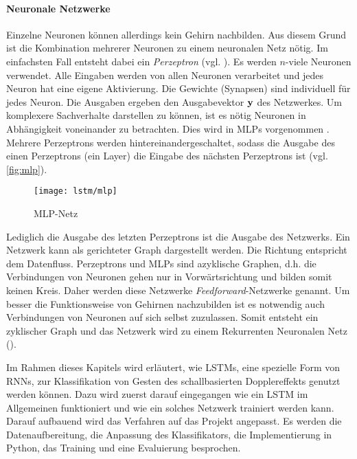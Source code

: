 \paragraph{Neuronale Netzwerke}
Einzelne Neuronen können allerdings kein Gehirn nachbilden. Aus diesem Grund ist
die Kombination mehrerer Neuronen zu einem neuronalen Netz nötig. Im einfachsten
Fall entsteht dabei ein \textit{Perzeptron} (vgl.
\cite{rosenblatt58a,1165576}). Es werden $n$-viele Neuronen verwendet. Alle
Eingaben werden von allen Neuronen verarbeitet und jedes Neuron hat eine eigene
Aktivierung. Die Gewichte (Synapsen) sind individuell für jedes Neuron. Die
Ausgaben ergeben den Ausgabevektor $\bf{y}$ des Netzwerkes. Um komplexere
Sachverhalte darstellen zu können, ist es nötig Neuronen in Abhängigkeit
voneinander zu betrachten. Dies wird in \acp{MLP} vorgenommen \cite{1165576}.
Mehrere Perzeptrons werden hintereinandergeschaltet, sodass die Ausgabe des
einen Perzeptrons (ein Layer) die Eingabe des nächsten Perzeptrons ist (vgl.
\autoref{fig:mlp}).
\begin{figure}[htbp]
    \centering
   \texttt{[image: lstm/mlp]}
\caption{MLP-Netz}
\label{fig:mlp}
\end{figure}
Lediglich die Ausgabe des letzten Perzeptrons ist die Ausgabe des Netzwerks.
Ein Netzwerk kann als gerichteter Graph dargestellt werden. Die Richtung
entspricht dem Datenfluss. Perzeptrons und \acp{MLP} sind azyklische Graphen,
d.h. die Verbindungen von Neuronen gehen nur in Vorwärtsrichtung und bilden
somit keinen Kreis. Daher werden diese Netzwerke \textit{Feedforward}-Netzwerke
genannt. Um besser die Funktionsweise von Gehirnen nachzubilden ist es notwendig
auch Verbindungen von Neuronen auf sich selbst zuzulassen. Somit entsteht ein
zyklischer Graph und das Netzwerk wird zu einem Rekurrenten Neuronalen Netz
(). \cite{RainerSchmoll2006}

Im Rahmen dieses Kapitels wird erläutert, wie \acsp{LSTM}, eine spezielle Form
von \acp{RNN}, zur Klassifikation von Gesten des schallbasierten Dopplereffekts
genutzt werden können. Dazu wird zuerst darauf eingegangen wie ein \ac{LSTM} im
Allgemeinen funktioniert und wie ein solches Netzwerk trainiert werden kann.
Darauf aufbauend wird das Verfahren auf das Projekt angepasst. Es werden die
Datenaufbereitung, die Anpassung des Klassifikators, die Implementierung in
Python, das Training und eine Evaluierung besprochen.


